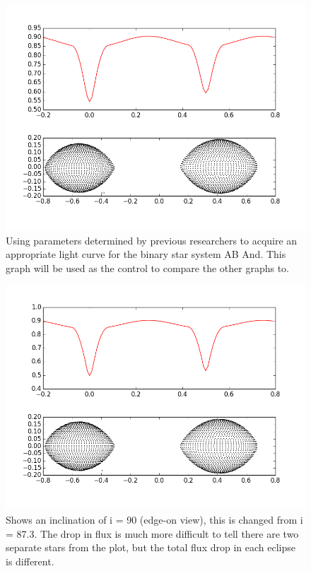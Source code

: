\documentclass[12pt,twocolumn]{article}
\begin{document}
\begin{center}
\begin{figure}
\includegraphics[scale=0.25]{figure_2}
\caption{\small{Using parameters determined by previous researchers to acquire an appropriate light curve for the binary star system AB And. This graph will be used as the control to compare the other graphs to.}}
\end{figure}
\end{center}

\begin{center}
\begin{figure}
\includegraphics[scale=0.25]{figure_1}
\caption{\small{Shows an inclination of i = 90 (edge-on view), this is changed from i = 87.3. The drop in flux is much more difficult to tell there are two separate stars from the plot, but the total flux drop in each eclipse is different.}}
\end{figure}
\end{center}
\end{document}
